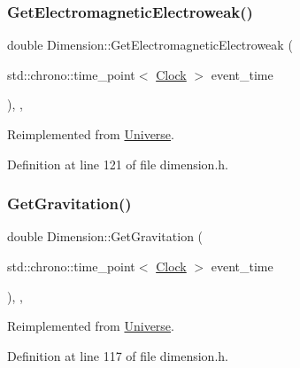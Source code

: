 \subsubsection{\texorpdfstring{Get\+Electromagnetic\+Electroweak()}{GetElectromagneticElectroweak()}}
{\footnotesize\ttfamily double Dimension\+::\+Get\+Electromagnetic\+Electroweak (\begin{DoxyParamCaption}\item[{std\+::chrono\+::time\+\_\+point$<$ \hyperlink{universe_8h_a0ef8d951d1ca5ab3cfaf7ab4c7a6fd80}{Clock} $>$}]{event\+\_\+time }\end{DoxyParamCaption})\hspace{0.3cm}{\ttfamily [inline]}, {\ttfamily [final]}, {\ttfamily [virtual]}}



Reimplemented from \hyperlink{class_universe_a9f099605c082e7fa755787a6a8cab7ba}{Universe}.



Definition at line 121 of file dimension.\+h.

\mbox{\label{class_dimension_a652220a2eb1b26c749ad032865d81788}} 
\subsubsection{\texorpdfstring{Get\+Gravitation()}{GetGravitation()}}
{\footnotesize\ttfamily double Dimension\+::\+Get\+Gravitation (\begin{DoxyParamCaption}\item[{std\+::chrono\+::time\+\_\+point$<$ \hyperlink{universe_8h_a0ef8d951d1ca5ab3cfaf7ab4c7a6fd80}{Clock} $>$}]{event\+\_\+time }\end{DoxyParamCaption})\hspace{0.3cm}{\ttfamily [inline]}, {\ttfamily [final]}, {\ttfamily [virtual]}}



Reimplemented from \hyperlink{class_universe_ab0404e774ee0ed66b597ff5b8e989446}{Universe}.



Definition at line 117 of file dimension.\+h.

\mbox{\label{class_dimension_a72f494215a114cb43cecd9b170bcde51}} 
